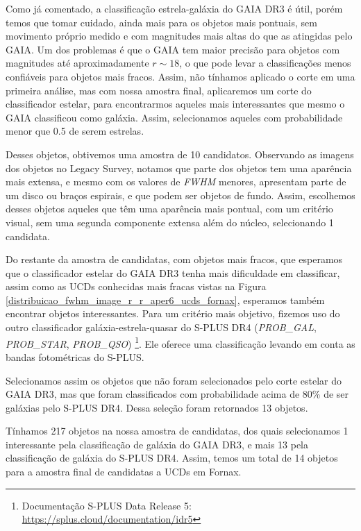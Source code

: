 Como já comentado, a classificação estrela-galáxia do GAIA DR3 é útil, porém temos que tomar cuidado, ainda mais para os objetos mais pontuais, sem movimento próprio medido e com magnitudes mais altas do que as atingidas pelo GAIA. Um dos problemas é que o GAIA tem maior precisão para objetos com magnitudes até aproximadamente $r \sim 18$, o que pode levar a classificações menos confiáveis para objetos mais fracos. Assim, não tínhamos aplicado o corte em uma primeira análise, mas com nossa amostra final, aplicaremos um corte do classificador estelar, para encontrarmos aqueles mais interessantes que mesmo o GAIA classificou como galáxia. Assim, selecionamos aqueles com probabilidade menor que 0.5 de serem estrelas.

Desses objetos, obtivemos uma amostra de 10 candidatos. Observando as imagens dos objetos no Legacy Survey, notamos que parte dos objetos tem uma aparência mais extensa, e mesmo com os valores de \textit{FWHM} menores, apresentam parte de um disco ou braços espirais, e que podem ser objetos de fundo. Assim, escolhemos desses objetos aqueles que têm uma aparência mais pontual, com um critério visual, sem uma segunda componente extensa além do núcleo, selecionando 1 candidata. 


Do restante da amostra de candidatas, com objetos mais fracos, que esperamos que o classificador estelar do GAIA DR3 tenha mais dificuldade em classificar, assim como as UCDs conhecidas mais fracas vistas na Figura \ref{distribuicao_fwhm_image_r_r_aper6_ucds_fornax}, esperamos também encontrar objetos interessantes. Para um critério mais objetivo, fizemos uso do outro classificador galáxia-estrela-quasar do S-PLUS DR4 (\textit{PROB\_GAL}, \textit{PROB\_STAR}, \textit{PROB\_QSO}) \citep{lili_classification}\footnote{Documentação S-PLUS Data Release 5: \url{https://splus.cloud/documentation/idr5}}. Ele oferece uma classificação levando em conta as bandas fotométricas do S-PLUS.

Selecionamos assim os objetos que não foram selecionados pelo corte estelar do GAIA DR3, mas que foram classificados com probabilidade acima de 80\% de ser galáxias pelo S-PLUS DR4. Dessa seleção foram retornados 13 objetos.

Tínhamos 217 objetos na nossa amostra de candidatas, dos quais selecionamos 1 interessante pela classificação de galáxia do GAIA DR3, e mais 13 pela classificação de galáxia do S-PLUS DR4. Assim, temos um total de 14 objetos para a amostra final de candidatas a UCDs em Fornax.

